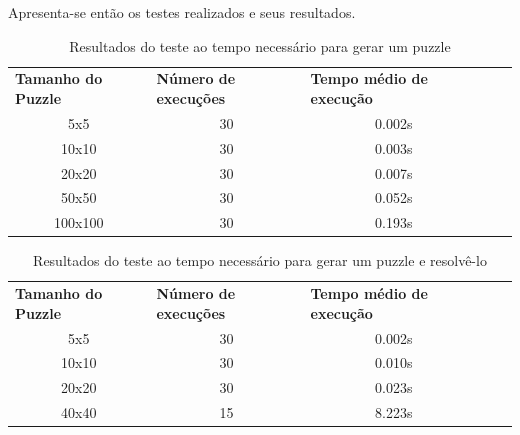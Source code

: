 \documentclass[runningheads,a4paper]{llncs}
\begin{document}
Apresenta-se então os testes realizados e seus resultados.

\begin{table}[]
\label{gamegenerator}
\begin{tabular}{cccll}
\multicolumn{1}{l}{\textbf{Tamanho do Puzzle}} & \multicolumn{1}{l}{\textbf{Número de execuções}} & \multicolumn{1}{l}{\textbf{Tempo médio de execução}} &  &  \\
5x5                                            & 30                                               & 0.002s                                               &  &  \\
10x10                                          & 30                                               & 0.003s                                               &  &  \\
20x20                                          & 30                                               & 0.007s                                               &  &  \\
50x50                                          & 30                                               & 0.052s                                               &  &  \\
100x100                                        & 30                                               & 0.193s                                               &  & 
\end{tabular}
\caption{Resultados do teste ao tempo necessário para gerar um puzzle}
\end{table}

\begin{table}[]
\centering
\begin{tabular}{cccll}
\multicolumn{1}{l}{\textbf{Tamanho do Puzzle}} & \multicolumn{1}{l}{\textbf{Número de execuções}} & \multicolumn{1}{l}{\textbf{Tempo médio de execução}} &  &  \\
5x5                                            & 30                                               & 0.002s                                               &  &  \\
10x10                                          & 30                                               & 0.010s                                               &  &  \\
20x20                                          & 30                                               & 0.023s                                               &  &  \\
40x40                                          & 15                                               & 8.223s                                               &  & 
\end{tabular}
\caption{Resultados do teste ao tempo necessário para gerar um puzzle e resolvê-lo}
\label{gemegeneratorandsolver}
\end{table}
\end{document}
